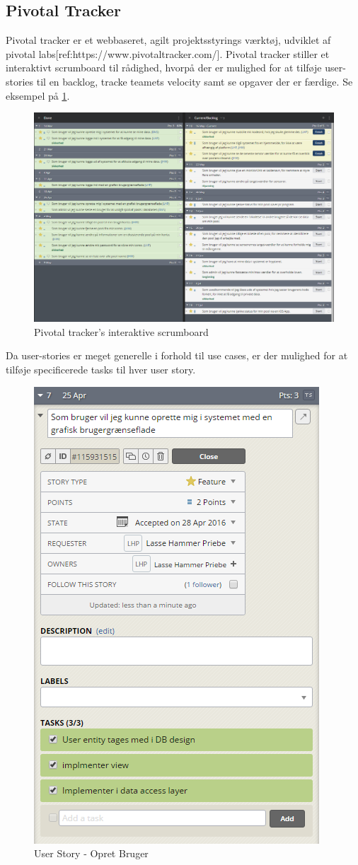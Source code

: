 \subsection{Pivotal Tracker}
Pivotal tracker er et webbaseret, agilt projektsstyrings værktøj, udviklet af pivotal labs[ref:https://www.pivotaltracker.com/]. Pivotal tracker stiller et interaktivt scrumboard til rådighed, hvorpå der er mulighed for at tilføje user-stories til en backlog, tracke teamets velocity samt se opgaver der er færdige. Se eksempel på \ref{fig:scrumboard}.

\begin{figure}
	\centering
	\includegraphics[width=\linewidth]{figs/processProjektGennemforsel/scrumboard.PNG}
	\caption{Pivotal tracker's interaktive scrumboard}
	\label{fig:scrumboard}
\end{figure}

 Da user-stories er meget generelle i forhold til use cases, er der mulighed for at tilføje specificerede tasks til hver user story.

\begin{figure}
\centering
\includegraphics[width=0.5\linewidth]{figs/processProjektGennemforsel/userstory_with_tasks.PNG}
\caption{User Story - Opret Bruger}
\label{fig:userstory_with_tasks}
\end{figure}

